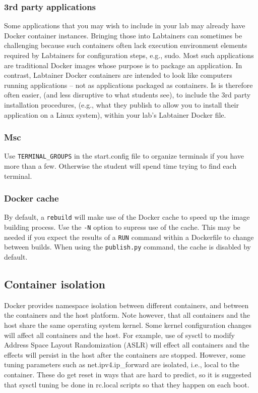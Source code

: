 \documentclass[12pt]{article}
\begin{document}
\subsubsection{3rd party applications}
Some applications that you may wish to include in your lab may already have Docker container
instances.  Bringing those into Labtainers can sometimes be challenging because such containers
often lack execution environment elements required by Labtainers for configuration steps, e.g.,
{sudo}.  Most such applications are traditional Docker images whose purpose is to package an
application.  In contrast, Labtainer Docker containers are intended to look like computers running
applications -- not as applications packaged as containers.  Is is therefore often easier, (and less
disruptive to what students see), to include the 3rd party installation procedures, (e.g., what they publish
to allow you to install their application on a Linux system), within your lab's Labtainer Docker file.

\subsubsection{Msc}
Use {\tt TERMINAL\_GROUPS} in the start.config file to organize terminals if you have more
than a few.  Otherwise the student will spend time trying to find each terminal.

\subsubsection {Docker cache}
By default, a {\tt rebuild} will make use of the Docker cache to speed up the image building process.
Use the {\tt -N} option to supress use of the cache.  This may be needed if you expect the results of
a {\tt RUN} command within a Dockerfile to change between builds.  When using the {\tt publish.py} command,
the cache is disabled by default.

\subsection {Container isolation}
Docker provides namespace isolation between different containers, and
between the containers and the host platform.  Note however, that all
containers and the host share the same operating system kernel.  Some
kernel configuration changes will affect all containers and the host.  For example,
use of sysctl to modify Address Space Layout Randomization (ASLR) will effect
all containers and the effects will persist in the host after the containers
are stopped.  However, some tuning parameters such as net.ipv4.ip\_forward are
isolated, i.e., local to the container. These do get reset in ways that are
hard to predict, so it is suggested that sysctl tuning be done in rc.local
scripts so that they happen on each boot.
\end{document}
